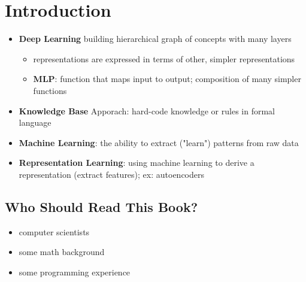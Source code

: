 \section{Introduction}\label{sec:introduction}
\begin{itemize}
    \item \textbf{Deep Learning} building hierarchical graph of concepts with many layers
    \begin{itemize}
        \item representations are expressed in terms of other, simpler representations
        \item \textbf{MLP}: function that maps input to output; composition of many simpler functions
    \end{itemize}
    \item \textbf{Knowledge Base} Apporach: hard-code knowledge or rules in formal language
    \item \textbf{Machine Learning}: the ability to extract ("learn") patterns from raw data
    \item \textbf{Representation Learning}: using machine learning to derive a representation (extract features); ex: autoencoders
\end{itemize}

\subsection{Who Should Read This Book?}
\begin{itemize}
    \item computer scientists
    \item some math background
    \item some programming experience
\end{itemize}

